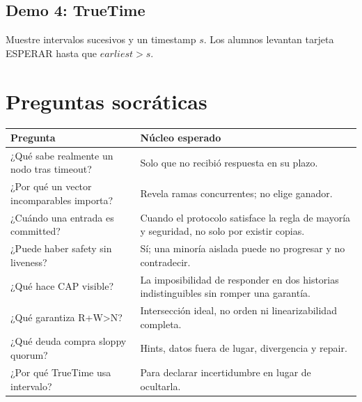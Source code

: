 \documentclass[variant=docente,cover=institutional,mode=screen]{ua-engineering-v6-article}
\begin{document}
\subsection{Demo 4: TrueTime}
Muestre intervalos sucesivos y un timestamp \(s\). Los alumnos levantan tarjeta ESPERAR hasta que \(earliest>s\).

\section{Preguntas socráticas}
\begin{longtable}{p{}p{}}
\toprule
Pregunta & Núcleo esperado\\
\midrule
¿Qué sabe realmente un nodo tras timeout? & Solo que no recibió respuesta en su plazo.\\
¿Por qué un vector incomparables importa? & Revela ramas concurrentes; no elige ganador.\\
¿Cuándo una entrada es committed? & Cuando el protocolo satisface la regla de mayoría y seguridad, no solo por existir copias.\\
¿Puede haber safety sin liveness? & Sí; una minoría aislada puede no progresar y no contradecir.\\
¿Qué hace CAP visible? & La imposibilidad de responder en dos historias indistinguibles sin romper una garantía.\\
¿Qué garantiza R+W>N? & Intersección ideal, no orden ni linearizabilidad completa.\\
¿Qué deuda compra sloppy quorum? & Hints, datos fuera de lugar, divergencia y repair.\\
¿Por qué TrueTime usa intervalo? & Para declarar incertidumbre en lugar de ocultarla.\\
\bottomrule
\end{longtable}
\end{document}
